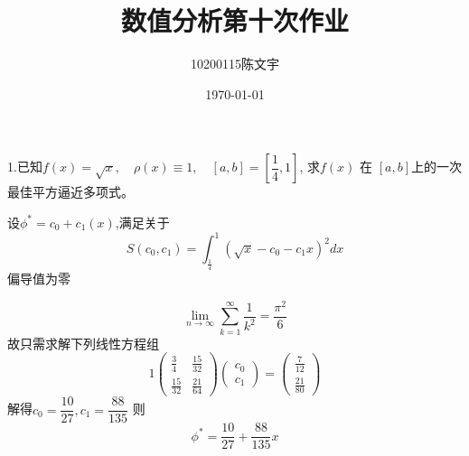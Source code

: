 \documentclass[UTF8]{ctexart}
\begin{document}
	
	\title{数值分析第十次作业}
	\author{10200115\quad 陈文宇}
	
	\date{\today}
	
	\maketitle{}
	


	1.已知$f(x)=\sqrt{x},\quad \rho(x) \equiv 1,\quad [a,b]=[\dfrac{1}{4},1]$,
	求$f(x)$ 在 $[a,b]$上的一次最佳平方逼近多项式。
	
	设$\phi^{*} = c_{0} + c_{1}(x)$,满足关于
	$$S(c_{0} , c_{1}) = \int^{1}_{\frac{1}{4}}(\sqrt{x} - c_{0} - c_{1}x )^{2}dx $$
	偏导值为零
	
	$$\lim\limits_{n \to \infty} \sum\limits_{k=1}^{\infty} \frac{1}{k^{2}}=\frac{\pi^{2}}{6} $$
	故只需求解下列线性方程组
	\[1
	\begin{pmatrix}
		\frac{3}{4} & \frac{15}{32} 
		\\
		\frac{15}{32} & \frac{21}{64}
	\end{pmatrix}
	\begin{pmatrix}
		c_{0}
		\\
		c_{1}
	\end{pmatrix}
	=
	\begin{pmatrix}
		\frac{7}{12}
		\\
		\frac{21}{80}
	\end{pmatrix}
	\]
	解得$c_{0}=\dfrac{10}{27},c_{1}=\dfrac{88}{135}$
	则$$\phi^{*}=\dfrac{10}{27}+\dfrac{88}{135}x$$
	


	

	
\end{document}
